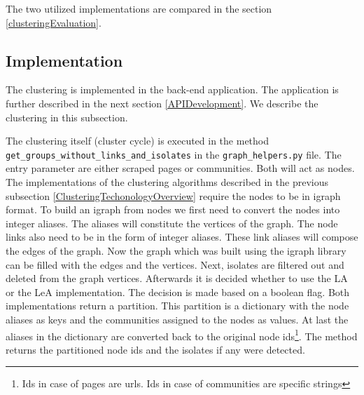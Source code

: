 The two utilized implementations are compared in the section \ref{clusteringEvaluation}.

\subsection{Implementation} \label{ClusteringImplementation}
The clustering is implemented in the back-end application. The application is further described in the next section \ref{APIDevelopment}. We describe the clustering in this subsection. 

The clustering itself (cluster cycle) is executed in the method \\ \texttt{get\_groups\_without\_links\_and\_isolates} in the \texttt{graph\_helpers.py} file. The entry parameter are either scraped pages or communities. Both will act as nodes. The implementations of the clustering algorithms described in the previous subsection \ref{ClusteringTechonologyOverview} require the nodes to be in igraph format. To build an igraph from nodes we first need to convert the nodes into integer aliases. The aliases will constitute the vertices of the graph. The node links also need to be in the form of integer aliases. These link aliases will compose the edges of the graph. Now the graph which was built using the igraph library can be filled with the edges and the vertices. Next, isolates are filtered out and deleted from the graph vertices. Afterwards it is decided whether to use the LA or the LeA implementation. The decision is made based on a boolean flag. Both implementations return a partition. This partition is a dictionary with the node aliases as keys and the communities assigned to the nodes as values. At last the aliases in the dictionary are converted back to the original node ids\footnote{Ids in case of pages are urls. Ids in case of communities are specific strings}. The method returns the partitioned node ids and the isolates if any were detected. 

